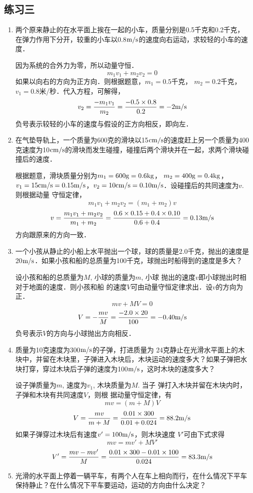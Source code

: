 \subsection{练习三}
\begin{enumerate}
    \item 两个原来静止的在水平面上挨在一起的小车，质量分别是0.5千克和0.2千克，在弹力作用下分开，较重的小车以0.8$\text{m}/\text{s}$的速度向右运动，求较轻的小车的速度．

    \begin{solution}
因为系统的合外力为零，所以动量守恒．
\[m_1v_1+m_2v_2=0\]
如果以向右的方向为正方向．则根据题意，$m_1=0.5$千克，
$m_2=0.2$千克，$v_1=0.8$米/秒．代入方程，可解得，
\[v_2=\frac{-m_1v_1}{m_2}=\frac{-0.5\times 0.8}{0.2}=-2\text{m}/\text{s}\]
负号表示较轻的小车的速度与假设的正方向相反，即向左．
    \end{solution}
    \item 在气垫导轨上，一个质量为600克的滑块以15${\rm cm}/{\rm s}$的速度赶上另一个质量为400克速度为10${\rm cm}/{\rm s}$的滑块而发生碰撞，碰撞后两个滑块并在一起，求两个滑块碰撞后的速度．

    \begin{solution}
根据题意，滑块质量分别为$m_1=600{\rm g}=0.6{\rm kg}$，
$m_2=400{\rm g}=0.4{\rm kg}$，$v_1=15{\rm cm/s}=0.15\text{m}/\text{s}$，$v_2=10{\rm cm/s}=0.10\text{m}/\text{s}$．设碰撞后的共同速度为$v$. 则根据动量
守恒定律，
\[m_1v_1+m_2v_2=(m_1+m_2)v\]
\[v=\frac{m_1v_1+m_2v_2}{m_1+m_2}=\frac{0.6\times 0.15+0.4\times 0.10}{0.6+0.4}=0.13\text{m}/\text{s}\]
方向跟原来的方向一致．
    \end{solution}
    \item 一个小孩从静止的小船上水平抛出一个球，球的质量是2.0千克，抛出的速度是20$\text{m}/\text{s}$．如果小孩和船的总质量为100千克，球抛出时船得到的速度是多大？

    \begin{solution}
    设小孩和船的总质量为$M$, 小球的质量为$m$, 小球
抛出的速度$v$即小球抛出时相对于地面的速度．则小孩和船
的速度$V$可由动量守恒定律求出．设$v$的方向为正．
\[mv+MV=0\]
\[V=-\frac{mv}{M}=\frac{-2.0\times 20}{100}=-0.40\text{m}/\text{s}\]
负号表示$V$的方向与小球抛出方向相反．
    \end{solution}
    \item 质量为10克速度为300$\text{m}/\text{s}$的子弹，打进质量为
    24克静止在光滑水平面上的木块中，并留在木块里，子弹进入木块后，木块运动的速度多大？如果子弹把水块打穿，穿过木块后子弹的速度为100$\text{m}/\text{s}$，这时木块的速度多大？

    \begin{solution}
    设子弹质量为$m$, 速度为$v_1$, 木块质量为$M$. 当子
弹打入木块并留在木块内时，子弹和木块有共同速度$V$，则根
据动量守恒定律，有
\[mv=(m+M)V\]
\[V=\frac{mv}{m+M}=\frac{0.01\times 300}{0.01+0.024}=88.2\text{m}/\text{s}\]
如果子弹穿过木块后有速度$v'=100\text{m}/\text{s}$，则木块速度
$V'$可由下式求得
\[mv= mv'+ MV'\]
\[V'=\frac{mv-mv'}{M}=\frac{0.01\times300-0.01\times100}{0.024}=83.3\text{m}/\text{s}\]
    \end{solution}
    \item 光滑的水平面上停着一辆平车，有两个人在车上相向而行，在什么情况下平车保持静止？在什么情况下平车要运动，运动的方向由什么决定？


\end{enumerate}
